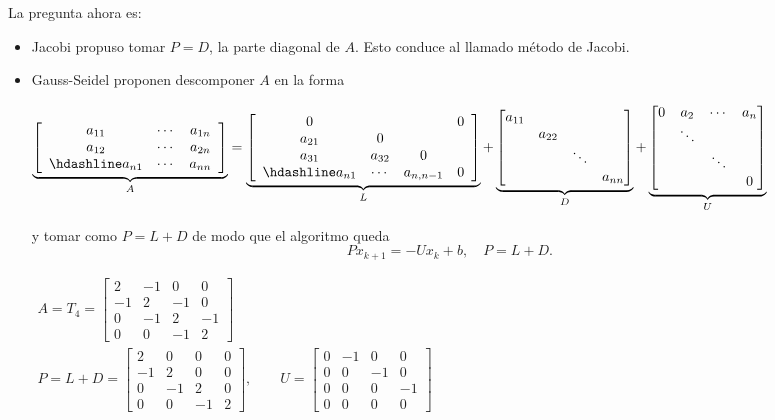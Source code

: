 La pregunta ahora es: 
\begin{itemize}
	\item Jacobi propuso tomar $P=D$, la parte diagonal de $A$. Esto conduce al llamado método de Jacobi.
	\item Gauss-Seidel proponen descomponer $A$ en la forma 
	
	$\underbrace{\left[\begin{array}{ccc}
			a_{11} & \cdots & a_{1n}\\
			a_{12} & \cdots & a_{2n}\\ \hdashline
			a_{n1} & \cdots & a_{nn}
		\end{array}\right]}_A=\underbrace{\left[\begin{array}{cccc}
		0 & & & 0\\
		a_{21} & 0 & & \\
		a_{31} & a_{32} & 0 & \\ \hdashline
		a_{n1} & \cdots & a_{n,n-1} & 0
		\end{array}\right]}_L+\underbrace{\begin{bmatrix}
		a_{11} & & & \\
		& a_{22} & & \\
		& & \ddots & \\
		& & & a_{nn}
	\end{bmatrix}}_D+\linebreak\underbrace{\begin{bmatrix}
	0 & a_{2} & \cdots & a_n\\
	 & \ddots  & & \\
	 & & \ddots & \\
	 & & & 0
\end{bmatrix}}_U$

y tomar como $P=L+D$ de modo que el algoritmo queda \[ Px_{k+1}=-Ux_k+b,\quad P=L+D. \]
\Ej

$\begin{array}{l}
	A=T_4=\begin{bmatrix}
		2 & -1 & 0 & 0 \\
		-1 & 2 & -1 & 0 \\
		0 & -1 & 2 & -1 \\
		0 & 0 & -1 & 2
	\end{bmatrix}\\
	P=L+D=\begin{bmatrix}
		2& 0 & 0 & 0 \\
		-1 & 2 & 0 & 0 \\
		0 & -1 & 2 & 0 \\
		0 & 0 & -1 & 2
	\end{bmatrix},\qquad U=\begin{bmatrix}
	0 & -1 & 0 & 0\\
	0 & 0 & -1 & 0\\
	0 & 0 & 0 & -1\\
	0 & 0 & 0 & 0
	\end{bmatrix}
\end{array}$


\end{itemize}
